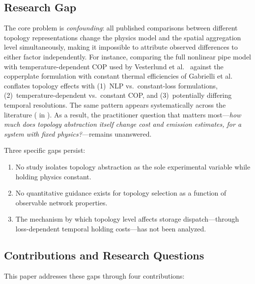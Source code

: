 \documentclass[review,3p]{elsarticle}
\begin{document}
\subsection{Research Gap}
\label{sec:gap}

The core problem is \emph{confounding}: all published comparisons
between different topology representations change the physics model
and the spatial aggregation level simultaneously, making it impossible
to attribute observed differences to either factor independently. For
instance, comparing the full nonlinear pipe model with
temperature-dependent COP used by Vesterlund et al.~\cite{Vesterlund2017}
against the copperplate formulation with constant thermal efficiencies
of Gabrielli et al.~\cite{Gabrielli2018} conflates topology effects
with (1)~NLP vs.\ constant-loss formulations, (2)~temperature-dependent
vs.\ constant COP, and (3)~potentially differing temporal resolutions.
The same pattern appears systematically across the literature
( in ). As a result, the
practitioner question that matters most---\emph{how much does topology
abstraction itself change cost and emission estimates, for a system
with fixed physics?}---remains unanswered.

Three specific gaps persist:
\begin{enumerate}[nosep]
    \item No study isolates topology abstraction as the sole
    experimental variable while holding physics constant.
    \item No quantitative guidance exists for topology selection as a
    function of observable network properties.
    \item The mechanism by which topology level affects storage
    dispatch---through loss-dependent temporal holding costs---has not
    been analyzed.
\end{enumerate}

\subsection{Contributions and Research Questions}
\label{sec:contributions}

This paper addresses these gaps through four contributions:
\end{document}
